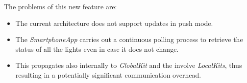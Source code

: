 \begin{enumerate}
\begin{figure}[H]
        \end{figure}
        The problems of this new feature are: 
        \begin{itemize}
            \item The current architecture does not support updates in push mode.
            \item The \textit{SmartphoneApp} carries out a continuous polling process to retrieve the status of all the lights even in case it does not change.
            \item This propagates also internally to \textit{GlobalKit} and the involve \textit{LocalKits}, thus resulting in a potentially significant communication overhead.
        \end{itemize}
\end{enumerate}